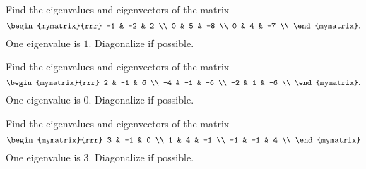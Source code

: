 \begin{ex}
  Find the eigenvalues and eigenvectors of the matrix
  \begin{equation*}
    \begin{mymatrix}{rrr}
      -1 & -2 & 2 \\
      0 & 5 & -8 \\
      0 & 4 & -7 \\
    \end{mymatrix}.
  \end{equation*}
  One eigenvalue is $1$. Diagonalize if possible.
\end{ex}

\begin{ex}
  Find the eigenvalues and eigenvectors of the matrix
  \begin{equation*}
    \begin{mymatrix}{rrr}
      2 &  -1 &   6 \\
      -4 &  -1 &  -6 \\
      -2 &   1 &  -6 \\
    \end{mymatrix}.
  \end{equation*}
  One eigenvalue is $0$. Diagonalize if possible.
\end{ex}

\begin{ex}
  Find the eigenvalues and eigenvectors of the matrix
  \begin{equation*}
    \begin{mymatrix}{rrr}
      3 &  -1 &   0 \\
      1 &   4 &  -1 \\
      -1 & -1 &   4 \\
    \end{mymatrix}
  \end{equation*}
  One eigenvalue is $3$. Diagonalize if possible.
\end{ex}

